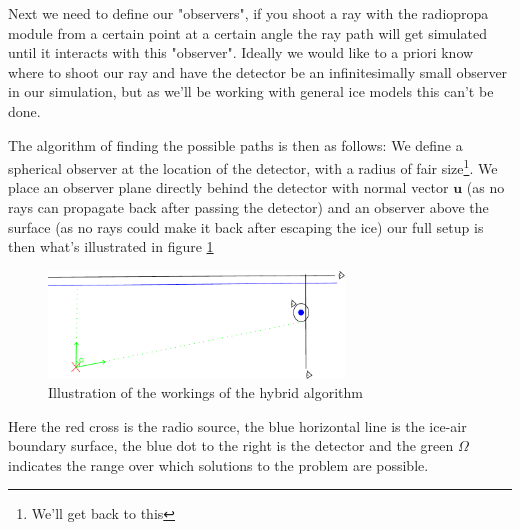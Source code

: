 \documentclass[11pt,a4paper,faculty=we,language=en,doctype=report]{cls/ugent-doc}
\begin{document}
Next we need to define our "observers", if you shoot a ray with the radiopropa
module from a certain point at a certain angle the ray path will get simulated
until it interacts with this "observer".  Ideally we would like to a priori
know where to shoot our ray and have the detector be an infinitesimally small
observer in our simulation, but as we'll be working with general ice models
this can't be done.

The algorithm of finding the possible paths is then as follows: We define a
spherical observer at the location of the detector, with a radius of fair
size\footnote{We'll get back to this}.  We place an observer plane directly
behind the detector with normal vector $\mathbf{u}$ (as no rays can propagate
back after passing the detector) and an observer above the surface (as no rays
could make it back after escaping the ice) our full setup is then what's
illustrated in figure \ref{fig:Illustration of hybrid algorithm}

\begin{figure}
  \centering
  \includegraphics[width=0.7\textwidth]{algoillu.pdf}
  \caption{Illustration of the workings of the hybrid algorithm}
  \label{fig:Illustration of hybrid algorithm}
\end{figure}

Here the red cross is the radio source, the blue horizontal line is the ice-air
boundary surface, the blue dot to the right is the detector and the green
$\Omega$ indicates the range over which solutions to the problem are possible.
\end{document}
